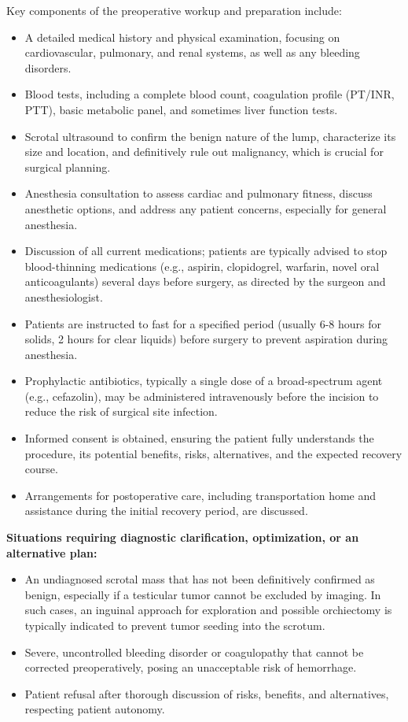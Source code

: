 Key components of the preoperative workup and preparation include:
\begin{itemize}
  \item A detailed medical history and physical examination, focusing on cardiovascular, pulmonary, and renal systems, as well as any bleeding disorders.
  \item Blood tests, including a complete blood count, coagulation profile (PT/INR, PTT), basic metabolic panel, and sometimes liver function tests.
  \item Scrotal ultrasound to confirm the benign nature of the lump, characterize its size and location, and definitively rule out malignancy, which is crucial for surgical planning.
  \item Anesthesia consultation to assess cardiac and pulmonary fitness, discuss anesthetic options, and address any patient concerns, especially for general anesthesia.
  \item Discussion of all current medications; patients are typically advised to stop blood-thinning medications (e.g., aspirin, clopidogrel, warfarin, novel oral anticoagulants) several days before surgery, as directed by the surgeon and anesthesiologist.
  \item Patients are instructed to fast for a specified period (usually 6-8 hours for solids, 2 hours for clear liquids) before surgery to prevent aspiration during anesthesia.
  \item Prophylactic antibiotics, typically a single dose of a broad-spectrum agent (e.g., cefazolin), may be administered intravenously before the incision to reduce the risk of surgical site infection.
  \item Informed consent is obtained, ensuring the patient fully understands the procedure, its potential benefits, risks, alternatives, and the expected recovery course.
  \item Arrangements for postoperative care, including transportation home and assistance during the initial recovery period, are discussed.
\end{itemize}

\textbf{Situations requiring diagnostic clarification, optimization, or an alternative plan:}
\begin{itemize}
  \item An undiagnosed scrotal mass that has not been definitively confirmed as benign, especially if a testicular tumor cannot be excluded by imaging. In such cases, an inguinal approach for exploration and possible orchiectomy is typically indicated to prevent tumor seeding into the scrotum.
  \item Severe, uncontrolled bleeding disorder or coagulopathy that cannot be corrected preoperatively, posing an unacceptable risk of hemorrhage.
  \item Patient refusal after thorough discussion of risks, benefits, and alternatives, respecting patient autonomy.
\end{itemize}

